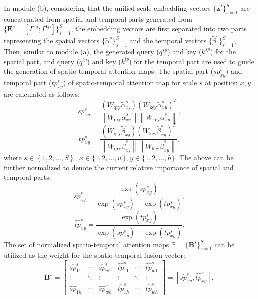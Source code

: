 \documentclass[journal]{IEEEtran}
\begin{document}
In module (b), considering that the unified-scale embedding vectors $\{\tilde{\mathbf{z}}^{s}\}_{s=1}^{S}$ are concatenated from spatial and temporal parts generated from $\{ \mathbf{E}^{s} =
[ \Gamma^{\mathrm{sp}} ;
\Gamma^{\mathrm{tp}}]\}_{s=1}^{S}$, the embedding vectors are first separated into two parts representing the spatial vectors $\{{\tilde{\alpha}}^{s}\}_{s=1}^{S}$  and the temporal vectors $\{\tilde{\beta}^{s}\}_{s=1}^{S}$, 
Then, similar to module (a), the generated query ($q^{sp} $) and key ($k^{sp} $) for the spatial part, and query ($q^{tp} $) and key ($k^{tp} $) for the temporal part are used to guide the generation of spatio-temporal attention maps. The spatial part ($sp^s_{xy}$) and temporal part ($tp^s_{xy}$) of spatio-temporal attention map for scale $ s $ at position $ x,y $ are calculated as follows:
\begin{equation}
{sp}_{xy}^{s}=\frac{
\left(W_{\mathrm{qry}} {\tilde{\alpha}_{xy}^{s}}\right)
\left(W_{\mathrm{key}} {\tilde{\alpha}_{xy}^{s}}\right)^{T}}{\left\|W_{\mathrm{qry}} {\tilde{\alpha}_{xy}^{s}}\right\|
\left\|W_{\mathrm{key}} {\tilde{\alpha}_{xy}^{s}}\right\|},
\end{equation}
\begin{equation}
{tp}_{xy}^{s}=\frac{
\left(W_{\mathrm{qry}} {\tilde{\beta}_{xy}^{s}}\right)
\left(W_{\mathrm{key}} {\tilde{\beta}_{xy}^{s}}\right)^{T}}{\left\|W_{\mathrm{qry}} {\tilde{\beta}_{xy}^{s}}\right\|
\left\|W_{\mathrm{key}} {\tilde{\beta}_{xy}^{s}}\right\|},
\end{equation}
where $ s \in\left\{1,2, \ldots, S\right\}$,
$x \in\{1,2, \ldots, w\}$,
$y \in\{1,2, \ldots, h\} $.
The above can be further normalized to denote the current relative importance of spatial and temporal parts:
\begin{equation}
\hat{sp}_{xy}^{s}=\frac{\exp \left({sp_{xy}^{s}}\right)}
{\exp \left({sp_{xy}^{s}}\right) + \exp \left({tp_{xy}^{s}}\right)},
\end{equation}
\begin{equation}
\hat{tp}_{xy}^{s}=\frac{\exp \left({tp_{xy}^{s}}\right)}
{\exp \left({sp_{xy}^{s}}\right) + \exp \left({tp_{xy}^{s}}\right)}.
\end{equation}
The set of normalized spatio-temporal attention maps $ \mathbb{B}=\{ \mathbf{B}^{s}\}_{s=1}^S $ can be utilized as the weight for the spatio-temporal fusion vector:
\begin{equation}
\mathbf{B}^{s}=
\begin{bmatrix}
   \hat{sp}^s_{11}& \cdots  & \hat{sp}^s_{w1} & \hat{tp}^s_{11}& \cdots  & \hat{tp}^s_{w1}\\
   \vdots & \ddots & \vdots & \vdots & \ddots & \vdots \\
  \hat{sp}^s_{1h}& \cdots  & \hat{sp}^s_{wh} & \hat{tp}^s_{1h}& \cdots  & \hat{tp}^s_{wh}
\end{bmatrix}
=\left [ \hat{sp}_{xy}^{s} ,\hat{tp}_{xy}^{s} \right ],
\end{equation}
\end{document}
